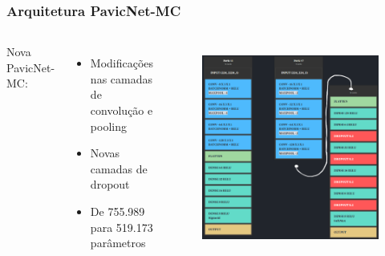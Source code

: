 \documentclass[aspectratio=169]{beamer}
\begin{document}
\begin{frame}
    \frametitle{Arquitetura PavicNet-MC}

    \vspace{-10px}
    \begin{columns}

        Nova PavicNet-MC:
        \begin{itemize}
            \item Modificações nas camadas de convolução e pooling
            \item Novas camadas de dropout
            \item De 755.989 para 519.173 parâmetros
        \end{itemize}


        \vspace{-30px}
        \begin{figure}
            \centering
            \includegraphics[scale=0.35]{img/NewPavicV7.png}
            \label{fig:enter-label}
        \end{figure}


    \end{columns}




\end{frame}
\end{document}
